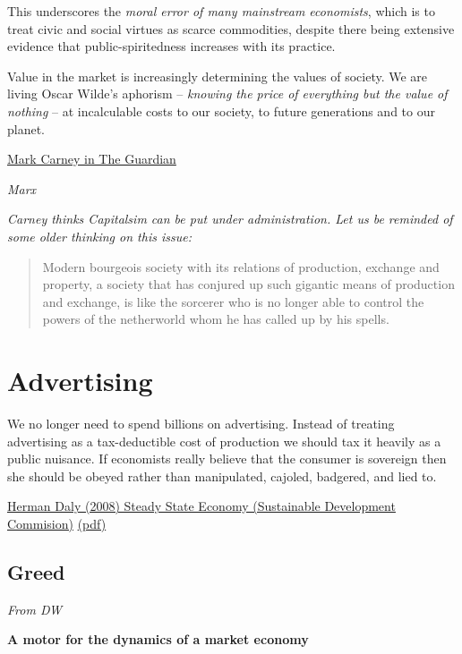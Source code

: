 \documentclass[
]{book}
\begin{document}
This underscores the \emph{moral error of many mainstream economists}, which is to treat civic and social virtues as scarce commodities, despite there being extensive evidence that public-spiritedness increases with its practice.

Value in the market is increasingly determining the values of society. We are living Oscar Wilde's aphorism -- \emph{knowing the price of everything but the value of nothing} -- at incalculable costs to our society, to future generations and to our planet.

\href{https://www.theguardian.com/business/2021/mar/13/crisis-in-values-exclusive-extract-mark-carneys-book}{Mark Carney in The Guardian}

\emph{Marx}

\emph{Carney thinks Capitalsim can be put under administration.
Let us be reminded of some older thinking on this issue:}

\begin{quote}
Modern bourgeois society with its relations of production, exchange and property, a society that has conjured up such gigantic means of production and exchange, is like the sorcerer who is no longer able to control the powers of the netherworld whom he has called up by his spells.
\end{quote}

\hypertarget{advertising}{%
\section{Advertising}\label{advertising}}

We no
longer need to spend billions on advertising. Instead of treating advertising as a tax-deductible cost of production we
should tax it heavily as a public nuisance. If economists really believe that the consumer is sovereign then she should
be obeyed rather than manipulated, cajoled, badgered, and lied to.

\href{http://\%20www.sd-commission.org.uk/publications.php@id=775.html}{Herman Daly (2008) Steady State Economy (Sustainable Development Commision)}
\href{pdf/Daly_2008_Steady_State_Economy_SD_Commision.pdf}{(pdf)}

\hypertarget{greed}{%
\subsection{Greed}\label{greed}}

\emph{From DW}

\textbf{A motor for the dynamics of a market economy}
\end{document}
